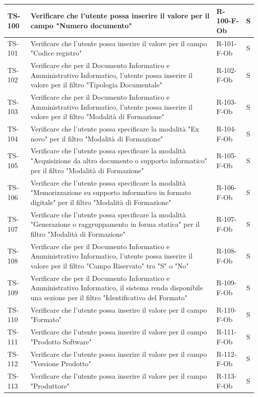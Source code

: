 \documentclass[a4paper,12pt]{article}
\begin{document}
\begin{longtable}{|p{1.5cm}|p{8.3cm}|p{2.4cm}|c|}
\hline
TS-100 & Verificare che l'utente possa inserire il valore per il campo "Numero documento" & R-100-F-Ob & S \\
\hline
TS-101 & Verificare che l'utente possa inserire il valore per il campo "Codice registro" & R-101-F-Ob & S \\
\hline
TS-102 & Verificare che per il Documento Informatico e Amministrativo Informatico, l'utente possa inserire il valore per il filtro "Tipologia Documentale" & R-102-F-Ob & S \\
\hline
TS-103 & Verificare che per il Documento Informatico e Amministrativo Informatico, l'utente possa inserire il valore per il filtro "Modalità di Formazione" & R-103-F-Ob & S \\
\hline
TS-104 & Verificare che l'utente possa specificare la modalità "Ex novo" per il filtro "Modalità di Formazione" & R-104-F-Ob & S \\
\hline
TS-105 & Verificare che l'utente possa specificare la modalità "Acquisizione da altro documento o supporto informatico" per il filtro "Modalità di Formazione" & R-105-F-Ob & S \\
\hline
TS-106 & Verificare che l'utente possa specificare la modalità "Memorizzazione su supporto informatico in formato digitale" per il filtro "Modalità di Formazione" & R-106-F-Ob & S \\
\hline
TS-107 & Verificare che l'utente possa specificare la modalità "Generazione o raggruppamento in forma statica" per il filtro "Modalità di Formazione" & R-107-F-Ob & S \\
\hline
TS-108 & Verificare che per il Documento Informatico e Amministrativo Informatico, l'utente possa inserire il valore per il filtro "Campo Riservato" tra "S" o "No" & R-108-F-Ob & S \\
\hline
TS-109 & Verificare che per il Documento Informatico e Amministrativo Informatico, il sistema renda disponibile una sezione per il filtro "Identificativo del Formato" & R-109-F-Ob & S \\
\hline
TS-110 & Verificare che l'utente possa inserire il valore per il campo "Formato" & R-110-F-Ob & S \\
\hline
TS-111 & Verificare che l'utente possa inserire il valore per il campo "Prodotto Software" & R-111-F-Ob & S \\
\hline
TS-112 & Verificare che l'utente possa inserire il valore per il campo "Versione Prodotto" & R-112-F-Ob & S \\
\hline
TS-113 & Verificare che l'utente possa inserire il valore per il campo "Produttore" & R-113-F-Ob & S \\

\end{longtable}
\end{document}
